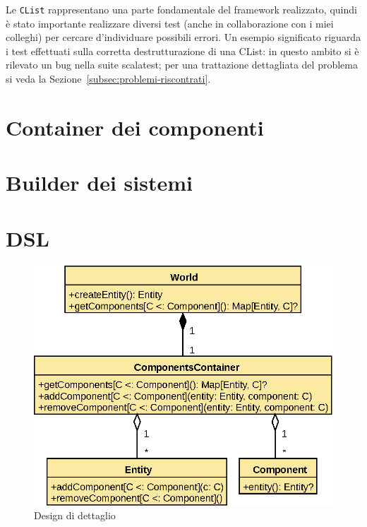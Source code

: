 Le \texttt{CList} rappresentano una parte fondamentale del framework realizzato, quindi è stato importante realizzare
diversi test (anche in collaborazione con i miei colleghi) per cercare d'individuare possibili errori.
Un esempio significato riguarda i test effettuati sulla corretta destrutturazione di una CList: in questo ambito si è
rilevato un bug nella suite scalatest;
per una trattazione dettagliata del problema si veda la Sezione~\ref{subsec:problemi-riscontrati}.

\section{Container dei componenti}\label{sec:container-dei-componenti}
\section{Builder dei sistemi}\label{sec:builder-dei-sistemi}
\section{DSL}\label{sec:dsl}

\begin{figure}
    \includegraphics{./img/WorldDetail}
    \caption{Design di dettaglio}
    \label{fig:figure2}
\end{figure}